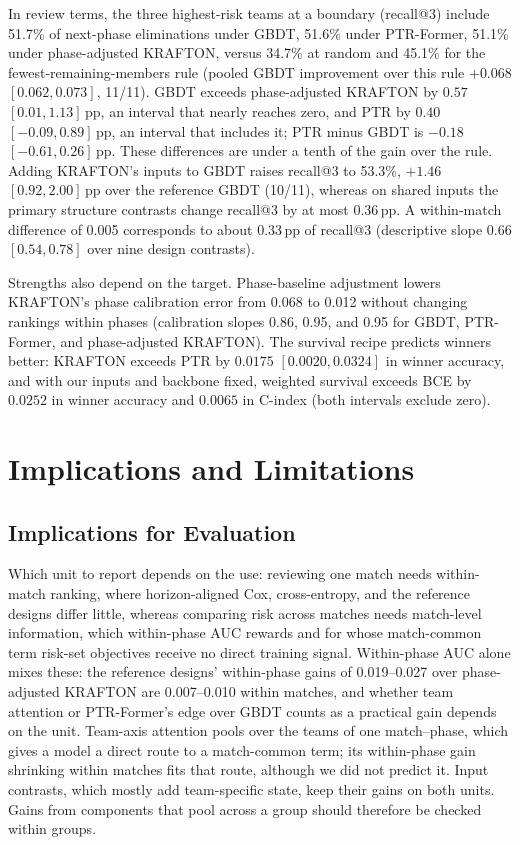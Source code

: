 \documentclass[sigconf,anonymous]{acmart}
\begin{document}
In review terms, the three highest-risk teams at a boundary (recall@3) include 51.7\% of next-phase eliminations under GBDT, 51.6\% under PTR-Former, 51.1\% under phase-adjusted KRAFTON, versus 34.7\% at random and 45.1\% for the fewest-remaining-members rule (pooled GBDT improvement over this rule $+0.068$ $[0.062,\allowbreak 0.073]$, 11/11). GBDT exceeds phase-adjusted KRAFTON by $0.57$ $[0.01,\allowbreak 1.13]$\,pp, an interval that nearly reaches zero, and PTR by $0.40$ $[-0.09,\allowbreak 0.89]$\,pp, an interval that includes it; PTR minus GBDT is $-0.18$ $[-0.61,\allowbreak 0.26]$\,pp. These differences are under a tenth of the gain over the rule. Adding KRAFTON's inputs to GBDT raises recall@3 to 53.3\%, $+1.46$ $[0.92,\allowbreak 2.00]$\,pp over the reference GBDT (10/11), whereas on shared inputs the primary structure contrasts change recall@3 by at most 0.36\,pp. A within-match difference of 0.005 corresponds to about 0.33\,pp of recall@3 (descriptive slope 0.66 $[0.54,\allowbreak 0.78]$ over nine design contrasts).

Strengths also depend on the target. Phase-baseline adjustment lowers KRAFTON's phase calibration error from 0.068 to 0.012 without changing rankings within phases (calibration slopes 0.86, 0.95, and 0.95 for GBDT, PTR-Former, and phase-adjusted KRAFTON). The survival recipe predicts winners better: KRAFTON exceeds PTR by $0.0175$ $[0.0020,\allowbreak 0.0324]$ in winner accuracy, and with our inputs and backbone fixed, weighted survival exceeds BCE by $0.0252$ in winner accuracy and $0.0065$ in C-index (both intervals exclude zero).


\section{Implications and Limitations}
\label{sec:discussion}
\subsection{Implications for Evaluation}
\label{sec:discussion:implications}
Which unit to report depends on the use: reviewing one match needs within-match ranking, where horizon-aligned Cox, cross-entropy, and the reference designs differ little, whereas comparing risk across matches needs match-level information, which within-phase AUC rewards and for whose match-common term risk-set objectives receive no direct training signal. Within-phase AUC alone mixes these: the reference designs' within-phase gains of 0.019--0.027 over phase-adjusted KRAFTON are 0.007--0.010 within matches, and whether team attention or PTR-Former's edge over GBDT counts as a practical gain depends on the unit. Team-axis attention pools over the teams of one match--phase, which gives a model a direct route to a match-common term; its within-phase gain shrinking within matches fits that route, although we did not predict it. Input contrasts, which mostly add team-specific state, keep their gains on both units. Gains from components that pool across a group should therefore be checked within groups.
\end{document}

